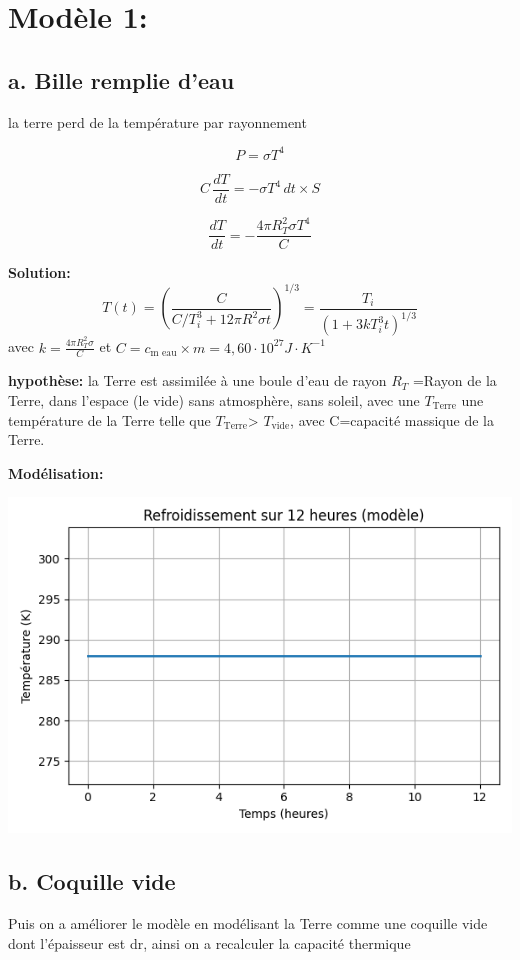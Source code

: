 \documentclass[a4paper,12pt]{article}
\begin{document}
\section{Modèle 1:}
\subsection{a. Bille remplie d'eau}

la terre perd de la température par rayonnement 

\[   P= \sigma T^4 
\]

\[    C \, \frac{dT}{dt} = - \sigma T^4 \, dt \times S
\]

\[\frac{dT}{dt} = - \frac{4 \pi R_T^2 \sigma T^4}{C}\]  

\textbf{Solution:} 
\[
T(t) = \left( \frac{C}{C/T_i^3 + 12\pi R^2 \sigma t} \right)^{1/3} 
= \frac{T_i}{\left(1 + 3k T_i^3 t \right)^{1/3}}
\]
avec \(k=\frac{4\pi R_T^2 \sigma}{C}\)
et \(C=c_{\text{m eau}}\times m=4,60 \cdot 10^{27} J\cdot K^{-1}\)

\bigskip

\textbf{hypothèse:} la Terre est assimilée à une boule d'eau de rayon \(R_{T}\) =Rayon de la Terre,  dans l'espace (le vide) sans atmosphère, sans soleil, avec une \(T_{\text{Terre}}\) une température de la Terre telle que  \(T_{\text{Terre}}\)> \(T_{\text{vide}}\), avec C=capacité massique de la Terre. 

\bigskip
\textbf{Modélisation:} 
    
    \includegraphics[width=0.8\linewidth]{../modele1/figures/modele1.png}
\\
\subsection{b. Coquille vide }
Puis on a améliorer le modèle en modélisant la Terre comme une coquille vide dont l'épaisseur est dr, ainsi on a recalculer la capacité thermique  \\
\end{document}

